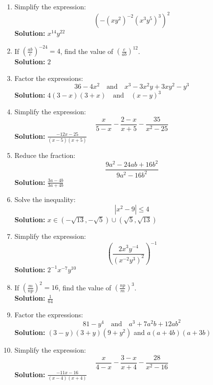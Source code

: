 \documentclass{article}
\begin{document}
\begin{enumerate}[leftmargin = 0.5cm, label = (\alph*), rightmargin = 0.2cm]

    \item Simplify the expression:
    \[
    \left( -(xy^2)^{-2}(x^3y^5)^3 \right)^2
    \]
    \textbf{Solution:} \( x^{14} y^{22} \)

    \item If \( \left( \frac{ab}{c} \right)^{-24} = 4 \), find the value of \( \left( \frac{c}{ab} \right)^{12} \). \\
    \textbf{Solution:} \( 2 \)

    \item Factor the expressions:
    \[
    36 - 4x^2 \quad \text{and} \quad x^3 - 3x^2y + 3xy^2 - y^3
    \]
    \textbf{Solution:} \( 4(3-x)(3+x) \quad \text{and} \quad (x-y)^3 \)

    \item Simplify the expression:
    \[
    \frac{x}{5-x} - \frac{2-x}{x+5} - \frac{35}{x^2 - 25}
    \]
    \textbf{Solution:} \( \frac{-12x - 25}{(x - 5)(x + 5)} \)

    \item Reduce the fraction:
    \[
    \frac{9a^2 - 24ab + 16b^2}{9a^2 - 16b^2}
    \]
    \textbf{Solution:} \( \frac{3a-4b}{3a+4b} \)

    \item Solve the inequality:
    \[
    |x^2 - 9| \leq 4
    \]
    \textbf{Solution:} $x \in (-\sqrt{13}, -\sqrt{5}) \cup (\sqrt{5}, \sqrt{13})$

    \item Simplify the expression:
    \[
    \left( \frac{2x^3y^{-4}}{(x^{-2}y^3)^2} \right)^{-1}
    \]
    \textbf{Solution:} \( 2^{-1}x^{-7}y^{10} \)

    \item If \( \left( \frac{m}{np} \right)^2 = 16 \), find the value of \( \left( \frac{np}{m} \right)^3 \). \\
    \textbf{Solution:} \( \frac{1}{64} \)

    \item Factor the expressions:
    \[
    81 - y^4 \quad \text{and} \quad a^3 + 7a^2b + 12ab^2
    \]
    \textbf{Solution:} \((3 - y)(3 + y)(9 + y^2) \) and \(a(a+4b)(a+3b) \)

    \item Simplify the expression:
    \[
    \frac{x}{4-x} - \frac{3-x}{x+4} - \frac{28}{x^2 - 16}
    \]
    \textbf{Solution:} \(\frac{-11x - 16}{(x - 4)(x + 4)}\)


\end{enumerate}
\end{document}
